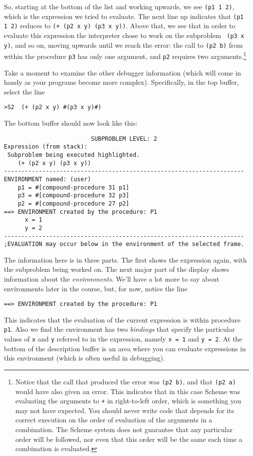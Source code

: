 So, starting at the bottom of the list and working upwards, we see
{\tt (p1 1 2)}, which is the expression we tried to evaluate.  The
next line up indicates that {\tt (p1 1 2)} reduces to {\tt (+
(p2 x y) (p3 x y))}.  Above that, we see that in order to evaluate
this expression the interpreter chose to work on the subproblem {\tt
(p3 x y)}, and so on, moving upwards until we reach the error: the
call to {\tt (p2 b)} from within the procedure {\tt p3} has only one
argument, and {\tt p2} requires two arguments.\footnote{Notice that
the call that produced the error was {\tt (p2 b)}, and that {\tt (p2
a)} would have also given an error.  This indicates that in this case
Scheme was evaluating the arguments to {\tt +} in right-to-left order,
which is something you may not have expected.  You should never write
code that depends for its correct execution on the order of evaluation
of the arguments in a combination.  The Scheme system does not
guarantee that any particular order will be followed, nor even
that this order will be the same each time a combination is
evaluated.}

Take a moment to examine the other debugger information (which will
come in handy as your programs become more complex).  Specifically, in
the top buffer, select the line
{\small
\begin{verbatim}
>S2  (+ (p2 x y) #(p3 x y)#)
\end{verbatim}
}

The bottom buffer should now look like this:
{\small
\begin{verbatim}
                         SUBPROBLEM LEVEL: 2
Expression (from stack):
 Subproblem being executed highlighted.
    (+ (p2 x y) (p3 x y))
---------------------------------------------------------------------
ENVIRONMENT named: (user)
    p1 = #[compound-procedure 31 p1]
    p3 = #[compound-procedure 32 p3]
    p2 = #[compound-procedure 27 p2]
==> ENVIRONMENT created by the procedure: P1
      x = 1
      y = 2
---------------------------------------------------------------------
;EVALUATION may occur below in the environment of the selected frame.
\end{verbatim}
}

The information here is in three parts.  The first shows the
expression again, with the subproblem being worked on.  The next major
part of the display shows information about the {\it environments}.
We'll have a lot more to say about environments later in the course,
but, for now, notice the line
{\small
\begin{verbatim}
==> ENVIRONMENT created by the procedure: P1
\end{verbatim}
}
This indicates that the evaluation of the current expression is within
procedure {\tt p1}.  Also we find the environment has two {\it bindings}
that specify the particular values of {\tt x} and {\tt y} referred
to in the expression, namely {\tt x = 1} and {\tt y = 2}.  At the bottom
of the description buffer is an area where you can evaluate
expressions in this environment (which is often useful in debugging).

